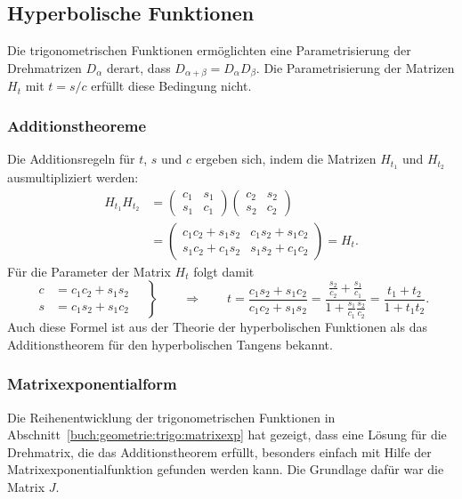 %
% 
\subsection{Hyperbolische Funktionen}
Die trigonometrischen Funktionen ermöglichten eine Parametrisierung
der Drehmatrizen $D_\alpha$ derart, dass
$D_{\alpha+\beta}=D_\alpha D_\beta$.
Die Parametrisierung der Matrizen $H_t$ mit $t=s/c$ erfüllt diese
Bedingung nicht.

\subsubsection{Additionstheoreme}
Die Additionsregeln für $t$, $s$ und $c$ ergeben sich, indem die
Matrizen $H_{t_1}$ und $H_{t_2}$ ausmultipliziert werden:
\begin{align*}
H_{t_1}H_{t_2}
&=
\begin{pmatrix}
c_1&s_1\\
s_1&c_1
\end{pmatrix}
\begin{pmatrix}
c_2&s_2\\
s_2&c_2
\end{pmatrix}
\\
&=
\begin{pmatrix}
c_1c_2+s_1s_2 & c_1s_2 + s_1c_2 \\
s_1c_2+c_1s_2 & s_1s_2 + c_1c_2
\end{pmatrix}
=
H_t.
\end{align*}
Für die Parameter der Matrix $H_t$ folgt damit
\[
\left.
\begin{aligned}
c&=c_1c_2+s_1s_2
\\
s&=c_1s_2+s_1c_2
\end{aligned}
\quad\right\}
\qquad\Rightarrow\qquad
t
=
\frac{c_1s_2+s_1c_2}{c_1c_2+s_1s_2}
=
\frac{\frac{s_2}{c_2}+\frac{s_1}{c_1}}{1+\frac{s_1}{c_1}\frac{s_2}{c_2}}
=
\frac{t_1+t_2}{1+t_1t_2}.
\]
Auch diese Formel ist aus der Theorie der hyperbolischen Funktionen
als das Additionstheorem für den hyperbolischen Tangens bekannt.

\subsubsection{Matrixexponentialform}
Die Reihenentwicklung der trigonometrischen Funktionen in
Abschnitt~\ref{buch:geometrie:trigo:matrixexp} hat gezeigt,
dass eine Lösung für die Drehmatrix, die das Additionstheorem
erfüllt, besonders einfach mit Hilfe der Matrixexponentialfunktion
gefunden werden kann.
Die Grundlage dafür war die Matrix $J$.

